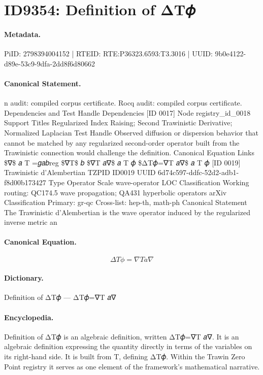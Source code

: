 \section*{ID9354: Definition of ΔT𝜙}
\paragraph{Metadata.}
PiID: 2798394004152 | RTEID: RTE:P36323.6593:T3.3016 | UUID: 9b0e4122-d89e-53c9-9dfa-2dd8f6d80662

\paragraph{Canonical Statement.}
n audit: compiled corpus certificate. Rocq audit: compiled corpus certificate. Dependencies and Test Handle Dependencies [ID 0017] Node registry\_id\_0018 Support Titles Regularized Index Raising; Second Trawinistic Derivative; Normalized Laplacian Test Handle Observed diffusion or dispersion behavior that cannot be matched by any regularized second-order operator built from the Trawinistic connection would challenge the definition. Canonical Equation Links \$∇\$ 𝑎 T =𝑔𝑎𝑏reg \$∇T\$ 𝑏 \$∇T 𝑎∇\$ 𝑎 T 𝜙 \$ΔT𝜙=∇T 𝑎∇\$ 𝑎 T 𝜙 [ID 0019] Trawinistic d’Alembertian TZPID ID0019 UUID 6d74c597-ddfc-52d2-adb1-f8d00b173427 Type Operator Scale wave-operator LOC Classification Working routing: QC174.5 wave propagation; QA431 hyperbolic operators arXiv Classification Primary: gr-qc Cross-list: hep-th, math-ph Canonical Statement The Trawinistic d’Alembertian is the wave operator induced by the regularized inverse metric an

\paragraph{Canonical Equation.}
\[
ΔT𝜙=∇T 𝑎∇
\]

\paragraph{Dictionary.}
Definition of ΔT𝜙 — ΔT𝜙=∇T 𝑎∇

\paragraph{Encyclopedia.}
Definition of ΔT𝜙 is an algebraic definition, written ΔT𝜙=∇T 𝑎∇. It is an algebraic definition expressing the quantity directly in terms of the variables on its right-hand side. It is built from T, defining ΔT𝜙. Within the Trawin Zero Point registry it serves as one element of the framework's mathematical narrative.
